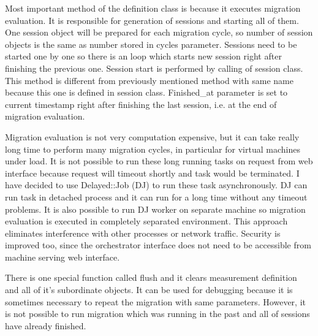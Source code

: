 Most important method of the definition class is  because it executes migration evaluation. It is responsible for generation of sessions and starting all of them. One session object will be prepared for each migration cycle, so number of session objects is the same as number stored in cycles parameter. Sessions need to be started one by one so there is an loop which starts new session right after finishing the previous one. Session start is performed by calling  of session class. This method is different from previously mentioned method with same name because this one is defined in session class.
Finished\_at parameter is set to current timestamp right after finishing the last session, i.e. at the end of migration evaluation. 

Migration evaluation is not very computation expensive, but it can take really long time to perform many migration cycles, in particular for virtual machines under load. It is not possible to run these long running tasks on request from web interface because request will timeout shortly and task would be terminated. I have decided to use Delayed::Job (\Ac{DJ}) to run these task asynchronously.
\Ac{DJ} can run task in detached process and it can run for a long time without any timeout problems. It is also possible to run \Ac{DJ} worker on separate machine so migration evaluation is executed in completely separated environment. This approach eliminates interference with other processes or network traffic. Security is improved too, since the orchestrator interface does not need to be accessible from machine serving web interface.

There is one special function called flush and it clears measurement definition and all of it's subordinate objects. It can be used for debugging because it is sometimes necessary to repeat the migration with same parameters. However, it is not possible to run migration which was running in the past and all of sessions have already finished.


